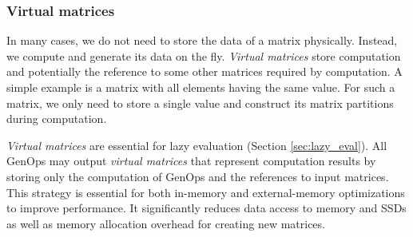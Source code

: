 \subsubsection{Virtual matrices} \label{virt_mat}
In many cases, we do not need to store the data of a matrix physically. Instead,
we compute and generate its data on the fly. \textit{Virtual matrices} store
computation and potentially the reference
to some other matrices required by computation. A simple example is a matrix
with all elements having the same value. For such a matrix, we only need to store
a single value and construct its matrix partitions during computation.

\textit{Virtual matrices} are essential for lazy evaluation (Section
\ref{sec:lazy_eval}). All GenOps may output \textit{virtual matrices} that
represent computation results by storing only the computation of GenOps
and the references to input matrices. This strategy is
essential for both in-memory and external-memory optimizations to improve
performance. It significantly reduces data access to memory and SSDs as well as
memory allocation overhead for creating new matrices.

%
%

